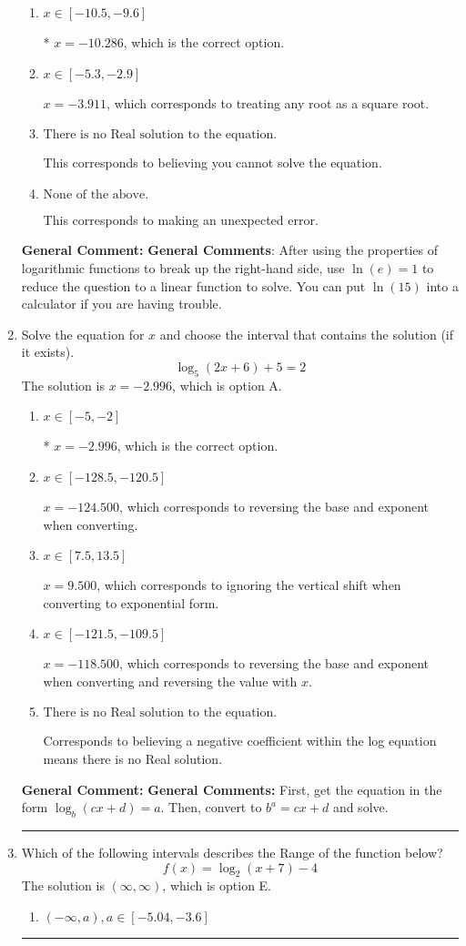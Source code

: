 \documentclass{extbook}[14pt]
\newcommand{\litem}[1]{\item #1

\rule{\textwidth}{0.4pt}}
\begin{document}
\begin{enumerate}
{\begin{enumerate}[label=\Alph*.]
$x = -2.109$, which corresponds to thinking you need to take the natural log of on the left before reducing.
\item \( x \in [-10.5, -9.6] \)

* $x = -10.286$, which is the correct option.
\item \( x \in [-5.3, -2.9] \)

$x = -3.911$, which corresponds to treating any root as a square root.
\item \( \text{There is no Real solution to the equation.} \)

This corresponds to believing you cannot solve the equation.
\item \( \text{None of the above.} \)

This corresponds to making an unexpected error.
\end{enumerate}

\textbf{General Comment:} \textbf{General Comments}: After using the properties of logarithmic functions to break up the right-hand side, use $\ln(e) = 1$ to reduce the question to a linear function to solve. You can put $\ln(15)$ into a calculator if you are having trouble.
}
\litem{
Solve the equation for $x$ and choose the interval that contains the solution (if it exists).
\[ \log_{5}{(2x+6)}+5 = 2 \]The solution is \( x = -2.996 \), which is option A.\begin{enumerate}[label=\Alph*.]
\item \( x \in [-5, -2] \)

* $x = -2.996$, which is the correct option.
\item \( x \in [-128.5, -120.5] \)

$x = -124.500$, which corresponds to reversing the base and exponent when converting.
\item \( x \in [7.5, 13.5] \)

$x = 9.500$, which corresponds to ignoring the vertical shift when converting to exponential form.
\item \( x \in [-121.5, -109.5] \)

$x = -118.500$, which corresponds to reversing the base and exponent when converting and reversing the value with $x$.
\item \( \text{There is no Real solution to the equation.} \)

Corresponds to believing a negative coefficient within the log equation means there is no Real solution.
\end{enumerate}

\textbf{General Comment:} \textbf{General Comments:} First, get the equation in the form $\log_b{(cx+d)} = a$. Then, convert to $b^a = cx+d$ and solve.
}
\litem{
Which of the following intervals describes the Range of the function below?
\[ f(x) = \log_2{(x+7)}-4 \]The solution is \( (\infty, \infty) \), which is option E.\begin{enumerate}[label=\Alph*.]
\item \( (-\infty, a), a \in [-5.04, -3.6] \)


\end{enumerate}}
\end{enumerate}
\end{document}
